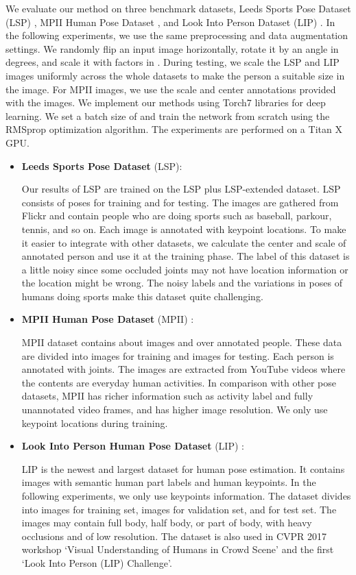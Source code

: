 \documentclass[10pt,twocolumn,letterpaper]{article}
\begin{document}
We evaluate our method on three benchmark datasets, Leeds Sports Pose Dataset (LSP) \cite{JohnsonE10}, MPII Human Pose Dataset \cite{AndrilukaPGS14}, and Look Into Person Dataset (LIP) \cite{GongLSL17}. In the following experiments, we use the same preprocessing and data augmentation settings. We randomly flip an input image horizontally, rotate it by an angle in  degrees, and scale it with factors in . During testing, we scale the LSP and LIP images uniformly across the whole datasets to make the person a suitable size in the image. For MPII images, we use the scale and center annotations provided with the images. We implement our methods using Torch7 libraries for deep learning. We set a batch size of  and train the network from scratch using the RMSprop optimization algorithm. The experiments are performed on a Titan X GPU. 
\begin{itemize}

\item \textbf{Leeds Sports Pose Dataset} (LSP):

Our results of LSP are trained on the LSP plus LSP-extended dataset. LSP consists of  poses for training and  for testing. The images are gathered from Flickr and contain people who are doing sports such as baseball, parkour, tennis, and so on. Each image is annotated with  keypoint locations. To make it easier to integrate with other datasets, we calculate the center and scale of annotated person and use it at the training phase. The label of this dataset is a little noisy since some occluded joints may not have location information or the location might be wrong. The noisy labels and the variations in poses of humans doing sports make this dataset quite challenging.

\item \textbf{MPII Human Pose Dataset} (MPII) :

MPII dataset contains about  images and over  annotated people. These data are divided into  images for training and  images for testing. Each person is annotated with  joints. The images are extracted from YouTube videos where the contents are everyday human activities. In comparison with other pose datasets, MPII has richer information such as activity label and fully unannotated video frames, and has higher image resolution. We only use keypoint locations during training.
　
\item \textbf{Look Into Person Human Pose Dataset} (LIP) :

LIP is the newest and largest dataset for human pose estimation. It contains  images with  semantic human part labels and  human keypoints. In the following experiments, we only use keypoints information. The dataset divides into  images for training set,  images for validation set, and  for test set. The images may contain full body, half body, or part of body, with heavy occlusions and of low resolution. The dataset is also used in CVPR 2017 workshop `Visual Understanding of Humans in Crowd Scene' and the first `Look Into Person (LIP) Challenge'.

\end{itemize}
\end{document}
